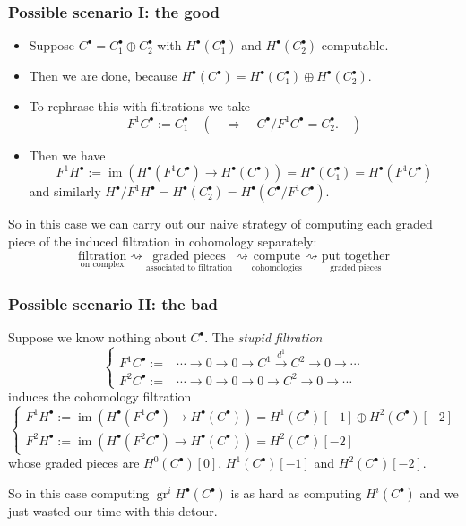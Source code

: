 \documentclass[notheorems, hyperref={backref}]{beamer}
\theoremstyle{darkgreentheorem}
\theoremstyle{darkbluedefinition}
\theoremstyle{darkredexample}
\theoremstyle{remark}
\DeclareMathOperator{\gr}{gr}
\DeclareMathOperator{\im}{im}
\newcommand{\op}{\oplus}
\begin{document}
\begin{frame}
    \frametitle{Possible scenario I: the good}
    \begin{itemize}
	\item Suppose $C^{\bullet}=C_{1}^{\bullet}\op C_{2}^{\bullet}$ with $H^{\bullet}(C_{1}^{\bullet})$ and $H^{\bullet}(C_{2}^{\bullet})$ computable.
	    \pause
	\item Then we are done, because $H^{\bullet}(C^{\bullet})=H^{\bullet}(C_{1}^{\bullet})\op H^{\bullet}(C_{2}^{\bullet})$.
	    \pause
	\item To rephrase this with filtrations we take
	    \vspace{-3mm}
	    \[ F^{1}C^{\bullet}:=C_{1}^{\bullet} \quad \left(\quad \Rightarrow \quad C^{\bullet}/F^{1}C^{\bullet}=C_{2}^{\bullet}. \quad \right) \]
	    \vspace{-8mm}
	    \pause
	\item Then we have
	    \[ F^{1}H^{\bullet}:=\im(H^{\bullet}(F^{1}C^{\bullet})\to H^{\bullet}(C^{\bullet}))=H^{\bullet}(C_{1}^{\bullet})=H^{\bullet}(F^{1}C^{\bullet}) \]
	    and similarly $H^{\bullet}/F^{1}H^{\bullet}=H^{\bullet}(C_{2}^{\bullet})=H^{\bullet}(C^{\bullet}/F^{1}C^{\bullet})$.
	    \pause
    \end{itemize}
    \vspace{2mm}
    So in this case we can carry out our naive strategy of computing each graded piece of the induced filtration in cohomology separately:
    \hspace{-10mm}
    \[ \boxed{\underset{\text{on complex}}{\text{filtration}}}\rightsquigarrow \boxed{\underset{\text{associated to filtration}}{\text{graded pieces}}} \rightsquigarrow \boxed{\underset{\text{cohomologies}}{\text{compute}}} \rightsquigarrow \boxed{\underset{{\text{graded pieces}}}{\text{put together}}} \]
\end{frame}

\begin{frame}
    \frametitle{Possible scenario II: the bad}
    Suppose we know nothing about $C^{\bullet}$.
	The \textit{stupid filtration}
	\[
	\begin{cases}
	    F^{1}C^{\bullet}:= & \cdots \to 0\to 0 \to C^{1}\xrightarrow{d^{1}} C^{2} \to 0 \to \cdots \\
	    F^{2}C^{\bullet}:= & \cdots \to 0 \to 0 \to 0 \to C^{2}\to 0 \to \cdots 
	\end{cases}
	\]
	induces the cohomology filtration
	\[
	\begin{cases}
	    F^{1}H^{\bullet}:=\im(H^{\bullet}(F^{1}C^{\bullet})\to H^{\bullet}(C^{\bullet}))=H^{1}(C^{\bullet})[-1]\op H^{2}(C^{\bullet})[-2] \\
	    F^{2}H^{\bullet}:=\im(H^{\bullet}(F^{2}C^{\bullet})\to H^{\bullet}(C^{\bullet}))=H^{2}(C^{\bullet})[-2]
	\end{cases}
	\]
	whose graded pieces are $H^{0}(C^{\bullet})[0]$, $H^{1}(C^{\bullet})[-1]$ and $H^{2}(C^{\bullet})[-2]$.

	So in this case computing $\gr^{i}H^{\bullet}(C^{\bullet})$ is as hard as computing $H^{i}(C^{\bullet})$ and we just wasted our time with this detour.
\end{frame}
\end{document}
